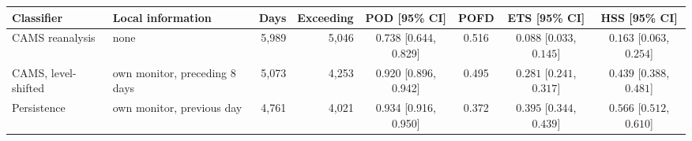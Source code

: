 \begin{tabular}{llrrcccc}\toprule
Classifier & Local information & Days & Exceeding & POD [95\% CI] & POFD & ETS [95\% CI] & HSS [95\% CI] \\ \midrule
CAMS reanalysis & none & 5{,}989 & 5{,}046 & 0.738 [0.644, 0.829] & 0.516 & $0.088$ [$0.033$, $0.145$] & $0.163$ [$0.063$, $0.254$] \\
CAMS, level-shifted & own monitor, preceding 8 days & 5{,}073 & 4{,}253 & 0.920 [0.896, 0.942] & 0.495 & $0.281$ [$0.241$, $0.317$] & $0.439$ [$0.388$, $0.481$] \\
Persistence & own monitor, previous day & 4{,}761 & 4{,}021 & 0.934 [0.916, 0.950] & 0.372 & $0.395$ [$0.344$, $0.439$] & $0.566$ [$0.512$, $0.610$] \\
\bottomrule\end{tabular}
